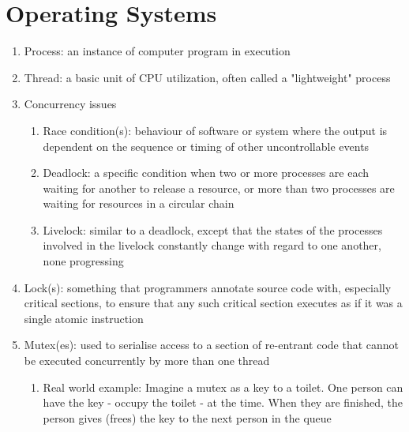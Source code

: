 \documentclass [12pt, executivepaper]{article}
\begin{document}
\pagebreak

\vspace*{-40mm}

\section*{Operating Systems}

\begin{enumerate}

\item Process: an instance of computer program in execution

\item Thread: a basic unit of CPU utilization, often called a "lightweight" process

\item Concurrency issues

\begin{enumerate}

\item Race condition(s): behaviour of software or system where the output is dependent on the sequence or timing of other uncontrollable events  

\item Deadlock: a specific condition when two or more processes are each waiting for another to release a resource, or more than two processes are waiting for resources in a circular chain

\item Livelock: similar to a deadlock, except that the states of the processes involved in the livelock constantly change with regard to one another, none progressing

\end{enumerate}

\item Lock(s): something that programmers annotate source code with, especially critical sections, to ensure that any such critical section executes as if it was a single atomic instruction

\item Mutex(es): used to serialise access to a section of  re-entrant code that cannot be executed concurrently by more than one thread

\begin{enumerate}

\item Real world example: Imagine a mutex as a key to a toilet. One person can have the key - occupy the toilet - at the time. When they are finished, the person gives (frees) the key to the next person in the queue


\end{enumerate}
\end{enumerate}
\end{document}
